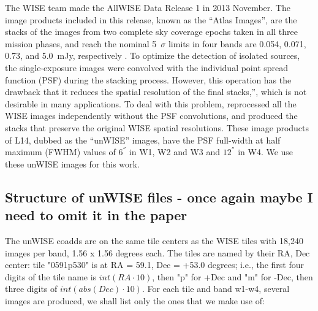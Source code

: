 \documentclass[numberedappendix,apj,twocolumn]{emulateapj}
\begin{document}


The WISE team made the AllWISE Data Release 1 in 2013 November. The image products included in this release, known as the ``Atlas Images'', are the stacks of the images from two complete sky coverage epochs taken in all three mission phases, and reach the nominal 5~$\sigma$ limits in four bands are 0.054, 0.071, 0.73, and 5.0~mJy, respectively \citep[see][for details]{2013wise.rept....1C}. To optimize the detection of isolated sources, the single-exposure images were convolved with the individual point spread function (PSF) during the stacking process. However, this operation has the drawback that it reduces the spatial resolution of the final stacks,”, which is not desirable in many applications. To deal with this problem, \citet[][hereafter L14]{Lang2014e} reprocessed all the WISE images independently without the PSF convolutions, and produced the stacks that preserve the original WISE spatial resolutions. These image products of L14,  dubbed as the ``unWISE'' images, have the PSF full-width at half maximum (FWHM) values of $6^{''}$ in W1, W2 and W3 and $12^{''}$ in W4. We use these unWISE images for this work.


\subsection{Structure of unWISE files - once again maybe I need to omit it in the paper}

The unWISE coadds are on the same tile centers as the WISE tiles with 18,240 images per band, 1.56 x 1.56 degrees each. The tiles are named by their RA, Dec center: tile "0591p530" is at RA = 59.1, Dec = +53.0 degrees; i.e., the first four digits of the tile name is $int(RA \cdot 10)$, then "p" for +Dec and "m" for -Dec, then three digits of $int(abs(Dec)\cdot 10)$. For each tile and band w1-w4, several images are produced, we shall list only the ones that we make use of:
\end{document}

